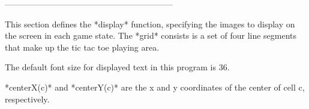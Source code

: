 \documentclass{led_doc}
\begin{document}
\begin{ledDef}
\end{ledDef}

\begin{ledDef}
\end{ledDef}

\begin{ledCmnt}
------------------------------------------------------------

This section defines the *display* function, specifying the images to display on the screen in each game state. The  *grid* consists is a set of four line segments that make up the tic tac toe playing area.
\end{ledCmnt}

\begin{ledDef}
\end{ledDef}

\begin{ledCmnt}
The default font size for displayed text in this program is 36.
\end{ledCmnt}

\begin{ledDef}
\end{ledDef}

\begin{ledCmnt}
*centerX(c)* and *centerY(c)* are the x and y coordinates of the center of cell c, respectively.
\end{ledCmnt}

\begin{ledDef}
\end{ledDef}

\begin{ledDef}
\end{ledDef}
\end{document}
